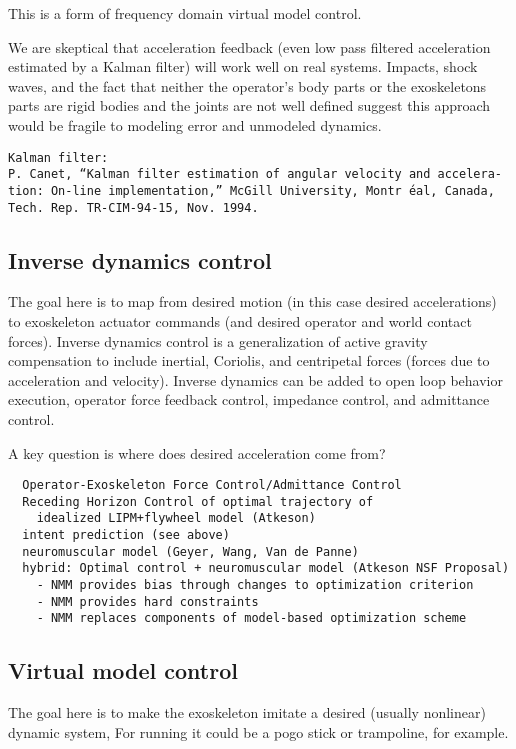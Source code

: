 \documentclass[letterpaper,12pt,fullpage]{article}
\begin{document}
This is a form of frequency domain virtual model control.

We are skeptical that acceleration feedback (even low pass filtered acceleration
estimated by a Kalman filter) will
work well on real systems. Impacts, shock waves, and the fact that neither
the operator's body parts or the exoskeletons parts are rigid bodies and the
joints are not well defined suggest this approach would be fragile to modeling
error and unmodeled dynamics.

\begin{verbatim}
Kalman filter:
P. Canet, “Kalman filter estimation of angular velocity and accelera-
tion: On-line implementation,” McGill University, Montr ́eal, Canada,
Tech. Rep. TR-CIM-94-15, Nov. 1994.
\end{verbatim}

\subsection{Inverse dynamics control}

The goal here is to map from desired motion (in this case desired
accelerations) to exoskeleton actuator commands (and desired operator
and world contact forces).
Inverse dynamics control is a generalization of active gravity compensation to include
inertial, Coriolis, and centripetal forces (forces due to acceleration and
velocity).
Inverse dynamics can be added to open loop behavior execution, operator force
feedback control, impedance control, and admittance control.

A key question is where does desired acceleration come from?
\begin{verbatim}
  Operator-Exoskeleton Force Control/Admittance Control  
  Receding Horizon Control of optimal trajectory of 
    idealized LIPM+flywheel model (Atkeson)
  intent prediction (see above)
  neuromuscular model (Geyer, Wang, Van de Panne)
  hybrid: Optimal control + neuromuscular model (Atkeson NSF Proposal)
    - NMM provides bias through changes to optimization criterion
    - NMM provides hard constraints
    - NMM replaces components of model-based optimization scheme
\end{verbatim}

\subsection{Virtual model control}

The goal here is to make the exoskeleton imitate a desired (usually nonlinear)
dynamic system,
For running it could be a pogo stick or trampoline, for example.
\end{document}
